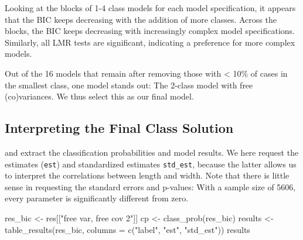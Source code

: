 \documentclass[
  man,floatsintext]{apa6}
\newenvironment{Shaded}{\begin{snugshade}}{\end{snugshade}}
\newcommand{\AttributeTok}[1]{\textcolor[rgb]{0.77,0.63,0.00}{#1}}
\newcommand{\FunctionTok}[1]{\textcolor[rgb]{0.00,0.00,0.00}{#1}}
\newcommand{\NormalTok}[1]{#1}
\newcommand{\OtherTok}[1]{\textcolor[rgb]{0.56,0.35,0.01}{#1}}
\newcommand{\StringTok}[1]{\textcolor[rgb]{0.31,0.60,0.02}{#1}}
\begin{document}
Looking at the blocks of 1-4 class models for each model specification,
it appears that the BIC keeps decreasing with the addition of more classes.
Across the blocks, the BIC keeps decreasing with increasingly complex model specifications.
Similarly, all LMR tests are significant, indicating a preference for more complex models.

Out of the 16 models that remain after removing those with \textless{} 10\% of cases in the smallest class,
one model stands out:
The 2-class model with free (co)variances.
We thus select this as our final model.

\hypertarget{interpreting-the-final-class-solution}{%
\subsection{Interpreting the Final Class Solution}\label{interpreting-the-final-class-solution}}

and extract the classification probabilities and model results.
We here request the estimates (\texttt{est}) and standardized estimates \texttt{std\_est}, because the latter allows us to interpret the correlations between length and width.
Note that there is little sense in requesting the standard errors and p-values: With a sample size of 5606, every parameter is significantly different from zero.

\begin{Shaded}
\begin{Highlighting}[]
\NormalTok{res\_bic }\OtherTok{\textless{}{-}}\NormalTok{ res[[}\StringTok{"free var, free cov 2"}\NormalTok{]]}
\NormalTok{cp }\OtherTok{\textless{}{-}} \FunctionTok{class\_prob}\NormalTok{(res\_bic)}
\NormalTok{results }\OtherTok{\textless{}{-}} \FunctionTok{table\_results}\NormalTok{(res\_bic, }\AttributeTok{columns =} \FunctionTok{c}\NormalTok{(}\StringTok{"label"}\NormalTok{, }\StringTok{"est"}\NormalTok{,}
    \StringTok{"std\_est"}\NormalTok{))}
\NormalTok{results}
\end{Highlighting}
\end{Shaded}
\end{document}
